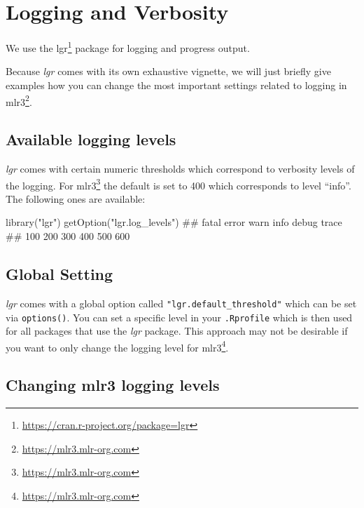 \documentclass[12pt,]{scrbook}
\newenvironment{Shaded}{}{}
\newcommand{\KeywordTok}[1]{\textcolor[rgb]{0.00,0.00,1.00}{#1}}
\newcommand{\NormalTok}[1]{#1}
\newcommand{\StringTok}[1]{\textcolor[rgb]{0.00,0.50,0.50}{#1}}
\renewcommand{\href}[2]{#2\footnote{\url{#1}}}
\begin{document}
\hypertarget{logging}{%
\section{Logging and Verbosity}\label{logging}}

We use the \href{https://cran.r-project.org/package=lgr}{lgr} package for logging and progress output.

Because \emph{lgr} comes with its own exhaustive vignette, we will just briefly give examples how you can change the most important settings related to logging in \href{https://mlr3.mlr-org.com}{mlr3}.

\hypertarget{available-logging-levels}{%
\subsection{Available logging levels}\label{available-logging-levels}}

\emph{lgr} comes with certain numeric thresholds which correspond to verbosity levels of the logging.
For \href{https://mlr3.mlr-org.com}{mlr3} the default is set to 400 which corresponds to level ``info''.
The following ones are available:

\begin{Shaded}
\begin{Highlighting}[]
\KeywordTok{library}\NormalTok{(}\StringTok{"lgr"}\NormalTok{)}
\KeywordTok{getOption}\NormalTok{(}\StringTok{"lgr.log_levels"}\NormalTok{)}
\NormalTok{## fatal error  warn  info debug trace }
\NormalTok{##   100   200   300   400   500   600}
\end{Highlighting}
\end{Shaded}

\hypertarget{global-setting}{%
\subsection{Global Setting}\label{global-setting}}

\emph{lgr} comes with a global option called \texttt{"lgr.default\_threshold"} which can be set via \texttt{options()}.
You can set a specific level in your \texttt{.Rprofile} which is then used for all packages that use the \emph{lgr} package.
This approach may not be desirable if you want to only change the logging level for \href{https://mlr3.mlr-org.com}{mlr3}.

\hypertarget{changing-mlr3-logging-levels}{%
\subsection{Changing mlr3 logging levels}\label{changing-mlr3-logging-levels}}
\end{document}
